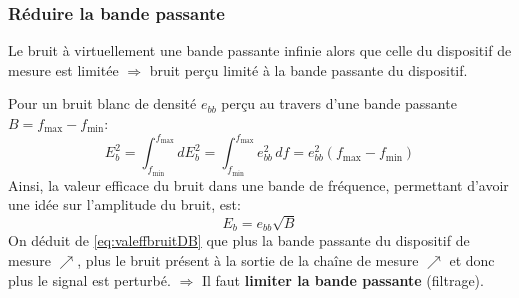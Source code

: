\subsubsection{Réduire la bande passante} \label{subsubsec:bandepass}
Le bruit à virtuellement une bande passante infinie alors que celle du dispositif de mesure est limitée \(\Rightarrow\) bruit perçu limité à la bande passante du dispositif.\bigbreak

Pour un bruit blanc de densité \(e_{bb}\) perçu au travers d'une bande passante \(B=f_{\text{max}}-f_{\text{min}}\):
\begin{equation}
E_b^2 = \int_{f_{\text{min}}}^{f_{\text{max}}} dE_b^2 = \int_{f_{\text{min}}}^{f_{\text{max}}} e_{bb}^2\,df = e_{bb}^2(f_{\text{max}}-f_{\text{min}}) 
\end{equation}
Ainsi, la valeur efficace du bruit dans une bande de fréquence, permettant d'avoir une idée sur l'amplitude du bruit, est:
\begin{equation}\label{eq:valeffbruitDB}
E_b = e_{bb}\sqrt{B}
\end{equation}
On déduit de \eqref{eq:valeffbruitDB} que plus la bande passante du dispositif de mesure \(\nearrow\), plus le bruit présent à la sortie de la chaîne de mesure \(\nearrow\) et donc plus le signal est perturbé. \(\Rightarrow\) Il faut \textbf{limiter la bande passante} (filtrage).\bigbreak

